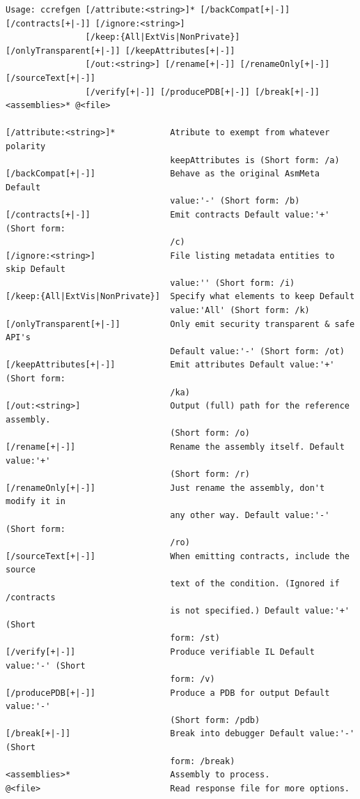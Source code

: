 \documentclass{article}
\begin{document}
{\small
\begin{verbatim}
Usage: ccrefgen [/attribute:<string>]* [/backCompat[+|-]] [/contracts[+|-]] [/ignore:<string>]
                [/keep:{All|ExtVis|NonPrivate}] [/onlyTransparent[+|-]] [/keepAttributes[+|-]]
                [/out:<string>] [/rename[+|-]] [/renameOnly[+|-]] [/sourceText[+|-]]
                [/verify[+|-]] [/producePDB[+|-]] [/break[+|-]] <assemblies>* @<file>

[/attribute:<string>]*           Atribute to exempt from whatever polarity
                                 keepAttributes is (Short form: /a)
[/backCompat[+|-]]               Behave as the original AsmMeta Default
                                 value:'-' (Short form: /b)
[/contracts[+|-]]                Emit contracts Default value:'+' (Short form:
                                 /c)
[/ignore:<string>]               File listing metadata entities to skip Default
                                 value:'' (Short form: /i)
[/keep:{All|ExtVis|NonPrivate}]  Specify what elements to keep Default
                                 value:'All' (Short form: /k)
[/onlyTransparent[+|-]]          Only emit security transparent & safe API's
                                 Default value:'-' (Short form: /ot)
[/keepAttributes[+|-]]           Emit attributes Default value:'+' (Short form:
                                 /ka)
[/out:<string>]                  Output (full) path for the reference assembly.
                                 (Short form: /o)
[/rename[+|-]]                   Rename the assembly itself. Default value:'+'
                                 (Short form: /r)
[/renameOnly[+|-]]               Just rename the assembly, don't modify it in
                                 any other way. Default value:'-' (Short form:
                                 /ro)
[/sourceText[+|-]]               When emitting contracts, include the source
                                 text of the condition. (Ignored if /contracts
                                 is not specified.) Default value:'+' (Short
                                 form: /st)
[/verify[+|-]]                   Produce verifiable IL Default value:'-' (Short
                                 form: /v)
[/producePDB[+|-]]               Produce a PDB for output Default value:'-'
                                 (Short form: /pdb)
[/break[+|-]]                    Break into debugger Default value:'-' (Short
                                 form: /break)
<assemblies>*                    Assembly to process.
@<file>                          Read response file for more options.
\end{verbatim}
}
\end{document}
